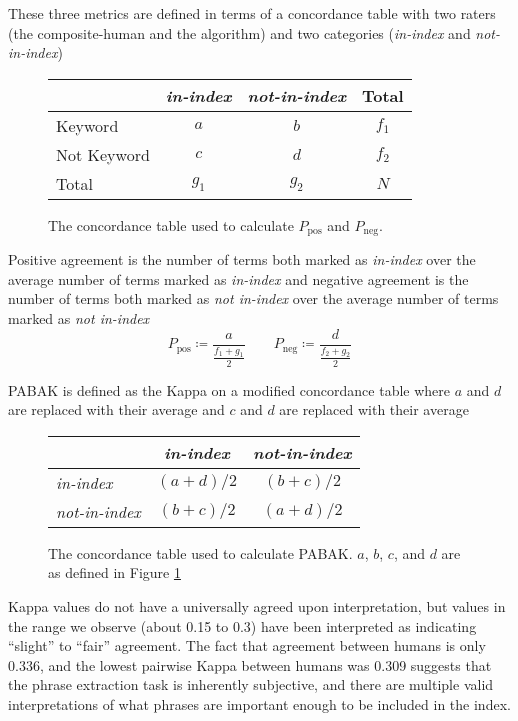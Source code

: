 These three metrics are defined in terms of a concordance table with
two raters (the composite-human and the algorithm) and two
categories ({\em in-index} and {\em not-in-index})

\begin{figure}[h]
\caption{The concordance table used to calculate $P_{\text{pos}}$ and $P_{\text{neg}}$. }
\label{fig:concordance_1}
\begin{tabular}{l || c c c}
& {\em in-index} & {\em not-in-index} & Total \\
\hline \hline
Keyword & $a$ & $b$ & $f_1$ \\
Not Keyword & $c$ & $d$ & $f_2$ \\
Total & $g_1$ & $g_2$ & $N$ \\
\end{tabular}
\end{figure}

Positive agreement is the number of terms both marked as {\em
  in-index} over the average number of terms marked as {\em in-index} and
negative agreement is the number of terms both marked as {\em not
  in-index} over the average number of terms marked as {\em not
  in-index}
\begin{equation*}
P_{\text{pos}} \coloneqq \frac{a}{\frac{f_1 + g_1}{2}}
 \qquad P_{\text{neg}} \coloneqq \frac{d}{\frac{f_2 + g_2}{2}}
\end{equation*}

PABAK is defined as the Kappa on a modified concordance table where $a$ and $d$ are replaced with their average and $c$ and $d$ are replaced with their average

\begin{figure}[h]
\caption{The concordance table used to calculate PABAK. $a$, $b$, $c$, and $d$ are as defined in Figure \ref{fig:concordance_1}}
\begin{tabular}{l || c c }
& {\em in-index} & {\em not-in-index} \\
\hline \hline
{\em in-index} & $(a + d) / 2$ & $(b + c) / 2$ \\
{\em not-in-index} & $(b + c) / 2$ & $(a + d) / 2$ \\
\end{tabular}
\end{figure}

Kappa values do not have a universally agreed upon interpretation, but
values in the range we observe (about 0.15 to 0.3) have been
interpreted as indicating ``slight'' to ``fair'' agreement. The fact
that agreement between humans is only 0.336, and the lowest pairwise
Kappa between humans was 0.309 suggests that the phrase extraction
task is inherently subjective, and there are multiple valid
interpretations of what phrases are important enough to be included in
the index.

